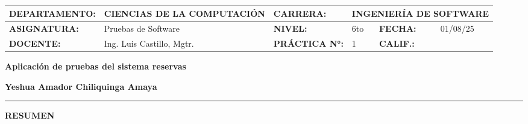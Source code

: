 \documentclass[12pt, a4paper]{article}
\begin{document}
\begin{table}[h]
    \centering
    \setlength{\arrayrulewidth}{0.5pt}
    \renewcommand{\arraystretch}{1.5}
    \small
    
    \begin{tabular}{|p{3.5cm}|p{4.8cm}|p{2.0cm}|p{1.8cm}|p{2.0cm}|p{1.8cm}|}
    \hline
    \rowcolor{graycell}\textbf{DEPARTAMENTO:} & 
    \cellcolor{white}\textbf{CIENCIAS DE LA COMPUTACIÓN} & 
    \textbf{CARRERA:} & 
    \multicolumn{3}{p{5.6cm}|}{\cellcolor{white}\textbf{INGENIERÍA DE SOFTWARE}} \\
    \hline
    \rowcolor{graycell}\textbf{ASIGNATURA:} & 
    \cellcolor{white}Pruebas de Software & 
    \textbf{NIVEL:} & 
    \cellcolor{white}6to & 
    \cellcolor{graycell}\textbf{FECHA:} & 
    \cellcolor{white}01/08/25 \\
    \hline
    \rowcolor{graycell}\textbf{DOCENTE:} & 
    \cellcolor{white}Ing. Luis Castillo, Mgtr. & 
    \textbf{PRÁCTICA N°:} & 
    \cellcolor{white}1 & 
    \cellcolor{graycell}\textbf{CALIF.:} & 
    \cellcolor{white} \\
    \hline
    \end{tabular}
\end{table}
\vspace{1cm}


\begin{center}
    \fontsize{14}{16}\selectfont\textbf{Aplicación de pruebas del sistema reservas}
\end{center}

\begin{center}
    \fontsize{12}{14}\selectfont\textbf{Yeshua Amador Chiliquinga Amaya}
    \vspace{0.5cm}
    \rule{\textwidth}{0.5pt}
\end{center}


\begin{center}
    \fontsize{11}{13}\selectfont\textbf{RESUMEN}
    
    \vspace{0.5cm}
    \parbox{0.9\textwidth}{\centering
    
    }
\end{center}
\vspace{0.5cm}
\end{document}
